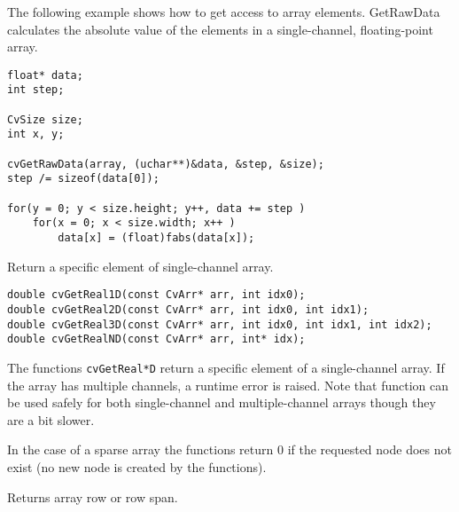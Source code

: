The following example shows how to get access to array elements. GetRawData calculates the absolute value of the elements in a single-channel, floating-point array.

\begin{lstlisting}
float* data;
int step;

CvSize size;
int x, y;

cvGetRawData(array, (uchar**)&data, &step, &size);
step /= sizeof(data[0]);

for(y = 0; y < size.height; y++, data += step )
    for(x = 0; x < size.width; x++ )
        data[x] = (float)fabs(data[x]);

\end{lstlisting}

Return a specific element of single-channel array.

\begin{lstlisting}
double cvGetReal1D(const CvArr* arr, int idx0);
double cvGetReal2D(const CvArr* arr, int idx0, int idx1);
double cvGetReal3D(const CvArr* arr, int idx0, int idx1, int idx2);
double cvGetRealND(const CvArr* arr, int* idx);
\end{lstlisting}

\begin{description}
\end{description}


The functions \texttt{cvGetReal*D} return a specific element of a single-channel array. If the array has multiple channels, a runtime error is raised. Note that  function can be used safely for both single-channel and multiple-channel arrays though they are a bit slower.

In the case of a sparse array the functions return 0 if the requested node does not exist (no new node is created by the functions).

\fi

\ifC %
Returns array row or row span.


